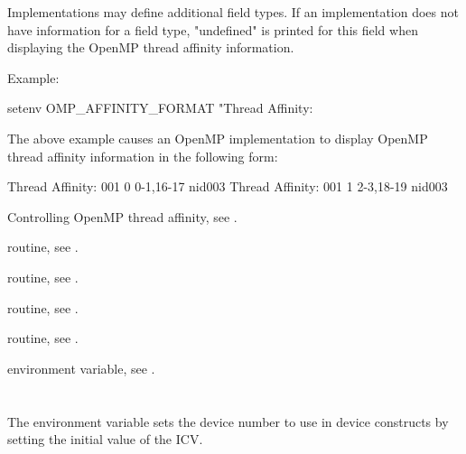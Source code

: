\linenumbers

Implementations may define additional field types.  If an implementation
does not have information for a field type, "undefined" is printed for
this field when displaying the OpenMP thread affinity information.

Example:
\begin{ompEnv}
setenv OMP_AFFINITY_FORMAT
       "Thread Affinity: %
\end{ompEnv}

The above example causes an OpenMP implementation to display OpenMP thread affinity information in the following form:
\begin{ompSyntax}
Thread Affinity: 001        0      0-1,16-17      nid003
Thread Affinity: 001        1      2-3,18-19      nid003
\end{ompSyntax}

\begin{crossrefs}
\item Controlling OpenMP thread affinity, see
.

\item {} routine,
see .

\item {} routine,
see .

\item {} routine,
see .

\item {} routine,
see .

\item {} environment variable,
see .
\end{crossrefs}



\section{}
\label{sec:OMP_DEFAULT_DEVICE}
The  environment variable sets the device number to use in
device constructs by setting the initial value of the  ICV.

